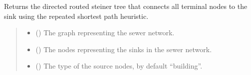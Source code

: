 \documentclass[letterpaper,10pt,english]{sphinxmanual}
\begin{document}
\begin{fulllineitems}
\label{\detokenize{pysewer:pysewer.routing.rsph_tree}}
\pysigstartsignatures
{}
\pysigstopsignatures
\sphinxAtStartPar
Returns the directed routed steiner tree that connects all terminal nodes to the sink using the repeated shortest path heuristic.
\begin{quote}\begin{description}
\begin{itemize}
\item {} 
\sphinxAtStartPar
{} () \textendash{} The graph representing the sewer network.

\item {} 
\sphinxAtStartPar
{} (\sphinxstyleliteralemphasis{\sphinxupquote{{[}}}\sphinxstyleliteralemphasis{\sphinxupquote{{]}}}) \textendash{} The nodes representing the sinks in the sewer network.

\item {} 
\sphinxAtStartPar
{} (\sphinxstyleliteralemphasis{\sphinxupquote{, }}) \textendash{} The type of the source nodes, by default “building”.


\end{itemize}
\end{description}
\end{quote}
\end{fulllineitems}
\end{document}
